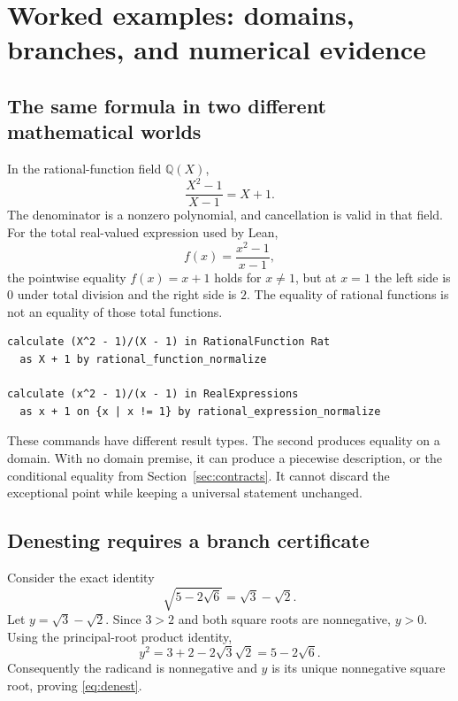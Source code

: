 \documentclass[11pt,letterpaper]{article}
\newcommand{\Q}{\mathbb Q}
\numberwithin{equation}{section}
\begin{document}
\section{Worked examples: domains, branches, and numerical evidence}\label{sec:branches}
\subsection{The same formula in two different mathematical worlds}
In the rational-function field $\Q(X)$,
\[
 \frac{X^2-1}{X-1}=X+1.
\]
The denominator is a nonzero polynomial, and cancellation is valid in that
field. For the total real-valued expression used by Lean,
\[
 f(x)=\frac{x^2-1}{x-1},
\]
the pointwise equality $f(x)=x+1$ holds for $x\ne1$, but at $x=1$ the left side
is $0$ under total division and the right side is $2$. The equality of rational
functions is not an equality of those total functions.

\par\noindent\begin{minipage}{\linewidth}
\begin{lstlisting}
calculate (X^2 - 1)/(X - 1) in RationalFunction Rat
  as X + 1 by rational_function_normalize

calculate (x^2 - 1)/(x - 1) in RealExpressions
  as x + 1 on {x | x != 1} by rational_expression_normalize
\end{lstlisting}
\end{minipage}\par


These commands have different result types. The second produces equality on a
domain. With no domain premise, it can produce a piecewise description, or the
conditional equality from Section~\ref{sec:contracts}. It cannot discard the
exceptional point while keeping a universal statement unchanged.

\subsection{Denesting requires a branch certificate}
Consider the exact identity
\begin{equation}
 \sqrt{5-2\sqrt6}=\sqrt3-\sqrt2.                       \label{eq:denest}
\end{equation}
Let $y=\sqrt3-\sqrt2$. Since $3>2$ and both square roots are nonnegative,
$y>0$. Using the principal-root product identity,
\[
 y^2=3+2-2\sqrt3\sqrt2=5-2\sqrt6.
\]
Consequently the radicand is nonnegative and $y$ is its unique nonnegative
square root, proving \eqref{eq:denest}.
\end{document}
